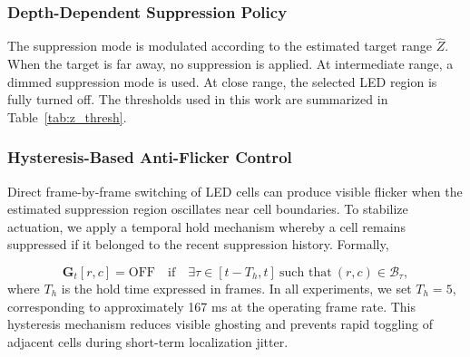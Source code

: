 \documentclass[pdflatex,sn-mathphys-num]{sn-jnl}%
\theoremstyle{thmstyleone}%
\theoremstyle{thmstyletwo}%
\theoremstyle{thmstylethree}%
\begin{document}
\subsubsection{Depth-Dependent Suppression Policy}

The suppression mode is modulated according to the estimated target range $\hat{Z}$. When the target is far away, no suppression is applied. At intermediate range, a dimmed suppression mode is used. At close range, the selected LED region is fully turned off. The thresholds used in this work are summarized in Table~\ref{tab:z_thresh}.

\begin{table}[t]
\centering
\caption{Depth-dependent glare suppression policy.}
\label{tab:z_thresh}
\end{table}

\subsubsection{Hysteresis-Based Anti-Flicker Control}

Direct frame-by-frame switching of LED cells can produce visible flicker when the estimated suppression region oscillates near cell boundaries. To stabilize actuation, we apply a temporal hold mechanism whereby a cell remains suppressed if it belonged to the recent suppression history. Formally,

\begin{equation}
\mathbf{G}_t[r,c] = \mathrm{OFF}
\quad \text{if} \quad
\exists \tau \in [t-T_h, t] \ \text{such that} \ (r,c) \in \mathcal{B}_{\tau},
\label{eq:hysteresis}
\end{equation}
where $T_h$ is the hold time expressed in frames. In all experiments, we set $T_h = 5$, corresponding to approximately 167 ms at the operating frame rate. This hysteresis mechanism reduces visible ghosting and prevents rapid toggling of adjacent cells during short-term localization jitter.
\end{document}

